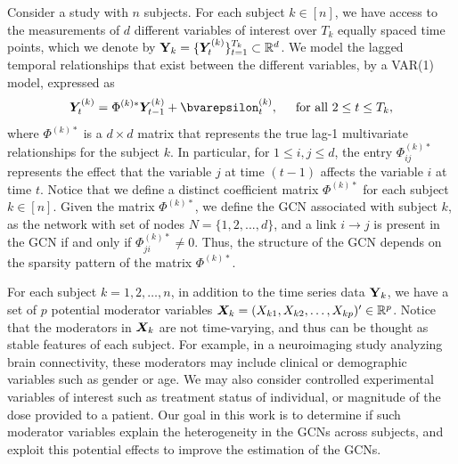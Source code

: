 Consider a study with $n$ subjects. For each subject $k\in[n]$, we have access to the measurements of $d$ different variables of interest over $T_k$ equally spaced time points, which we denote by $\mathbf{Y}_{k} = \{ \bm{Y}_{t}^{(k)} \}_{t = 1}^{T_k}\subset \mathbb{R}^{d}$. We model the lagged temporal relationships that exist between the different variables, by a VAR(1) model, expressed as
\begin{equation*}
	\bY_{t}^{(k)} =  \Phi^{(k)*} \bY_{t-1}^{(k)} + \bvarepsilon_{t}^{(k)}, \hspace{5mm} \text{for all } 2\leq t\leq T_k,
\end{equation*}
where $\Phi^{(k)*}$ is a $d\times d$ matrix that represents the true lag-1 multivariate relationships for the subject $k$. In particular, for $1\leq i,j\leq d$, the entry $\Phi^{(k)*}_{ij}$ represents the effect that the variable $j$ at time $(t-1)$ affects the variable $i$ at time $t$. Notice that we define a distinct coefficient matrix $\Phi^{(k)*}$ for each subject $k\in[n]$. Given the matrix $\Phi^{(k)*}$, we define the GCN associated with subject $k$, as the network with set of nodes $N = \{1,2,...,d\}$, and a link $i\to j$ is present in the GCN if and only if $\Phi^{(k)*}_{ji}\neq 0$. Thus, the structure of the GCN depends on the sparsity pattern of the matrix $\Phi^{(k)*}$. 

For each subject $k=1,2,\ldots, n$, in addition to the time series data $\mathbf{Y}_k$, we have a set of $p$ potential moderator variables $\bm{X}_k = (X_{k1}, X_{k2}, \ldots, X_{kp})'\in\mathbb{R}^{p}$. Notice that the moderators in $\bm{X}_k$ are not time-varying, and thus can be thought as stable features of each subject. For example, in a neuroimaging study analyzing brain connectivity, these moderators may include clinical or demographic variables such as gender or age. We may also consider controlled experimental variables of interest such as treatment status of individual, or magnitude of the dose provided to a patient. Our goal in this work is to determine if such moderator variables explain the heterogeneity in the GCNs across subjects, and exploit this potential effects to improve the estimation of the GCNs. 



